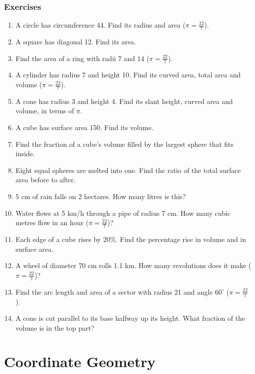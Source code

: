 \documentclass[11pt,a4paper,openany]{report}
\newenvironment{exercises}{\subsection*{Exercises \thechapter}\begin{enumerate}[label=\textbf{\thechapter.\arabic*},leftmargin=3.2em]}{\end{enumerate}}
\begin{document}
\begin{exercises}
\item A circle has circumference 44. Find its radius and area ($\pi=\frac{22}7$).
\item A square has diagonal 12. Find its area.
\item Find the area of a ring with radii 7 and 14 ($\pi=\frac{22}7$).
\item A cylinder has radius 7 and height 10. Find its curved area, total area and volume ($\pi=\frac{22}7$).
\item A cone has radius 3 and height 4. Find its slant height, curved area and volume, in terms of $\pi$.
\item A cube has surface area 150. Find its volume.
\item Find the fraction of a cube's volume filled by the largest sphere that fits inside.
\item Eight equal spheres are melted into one. Find the ratio of the total surface area before to after.
\item 5 cm of rain falls on 2 hectares. How many litres is this?
\item Water flows at 5 km/h through a pipe of radius 7 cm. How many cubic metres flow in an hour ($\pi=\frac{22}7$)?
\item Each edge of a cube rises by 20\%. Find the percentage rise in volume and in surface area.
\item A wheel of diameter 70 cm rolls 1.1 km. How many revolutions does it make ($\pi=\frac{22}7$)?
\item Find the arc length and area of a sector with radius 21 and angle $60^\circ$ ($\pi=\frac{22}7$).
\item A cone is cut parallel to its base halfway up its height. What fraction of the volume is in the top part?
\end{exercises}

\chapter{Coordinate Geometry}\label{ch:coord}
\end{document}
